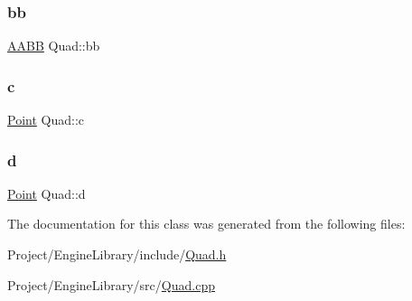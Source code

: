 \mbox{\label{class_quad_a2f4674ea8313163f9ff4a7cbe707fae3}} 
\subsubsection{\texorpdfstring{bb}{bb}}
{\footnotesize\ttfamily \mbox{\hyperlink{class_a_a_b_b}{A\+A\+BB}} Quad\+::bb}

\mbox{\label{class_quad_a90ece951ddbf1c23049a912e26068680}} 
\subsubsection{\texorpdfstring{c}{c}}
{\footnotesize\ttfamily \mbox{\hyperlink{class_point}{Point}} Quad\+::c}

\mbox{\label{class_quad_ac1855601f7ffc0f7d77f06ee60d541d6}} 
\subsubsection{\texorpdfstring{d}{d}}
{\footnotesize\ttfamily \mbox{\hyperlink{class_point}{Point}} Quad\+::d}



The documentation for this class was generated from the following files\+:\begin{DoxyCompactItemize}
\item 
Project/\+Engine\+Library/include/\mbox{\hyperlink{_quad_8h}{Quad.\+h}}\item 
Project/\+Engine\+Library/src/\mbox{\hyperlink{_quad_8cpp}{Quad.\+cpp}}\end{DoxyCompactItemize}
